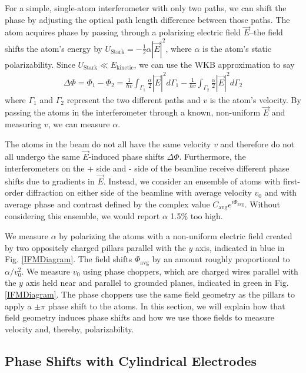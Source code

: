 \documentclass[twocolumn,prl,showpacs,superscriptaddress]{revtex4-1}   %
\newcommand{\abs}[1]{\left|#1\right|}
\newcommand{\figref}[1]{Fig. \ref{#1}}
\begin{document}
For a simple, single-atom interferometer with only two paths, we can shift the phase by adjusting the optical path length difference between those paths. The atom acquires phase by passing through a polarizing electric field $\vec{E}$--the field shifts the atom's energy by $U_{\mathrm{Stark}} = -\frac{1}{2}\alpha\abs{\vec{E}}^2$, where $\alpha$ is the atom's static polarizability. Since $U_{\mathrm{Stark}} \ll E_{\mathrm{kinetic}}$, we can use the WKB approximation to say
\begin{align}
	\Delta\Phi = \Phi_1 - \Phi_2 =
	\frac{1}{\hbar v} \int_{\Gamma_1} \frac{\alpha}{2}|\vec{E}|^2 d\Gamma_1 -
	\frac{1}{\hbar v} \int_{\Gamma_2} \frac{\alpha}{2}|\vec{E}|^2 d\Gamma_2
	\label{deltaPhaseGeneral}
\end{align}
where $\Gamma_1$ and $\Gamma_2$ represent the two different paths and $v$ is the atom's velocity. By passing the atoms in the interferometer through a known, non-uniform $\vec{E}$ and measuring $v$, we can measure $\alpha$.

The atoms in the beam do not all have the same velocity $v$ and therefore do not all undergo the same $\vec{E}$-induced phase shifts $\Delta\Phi$. Furthermore, the interferometers on the + side and - side of the beamline receive different phase shifts due to gradients in $\vec{E}$. Instead, we consider an ensemble of atoms with first-order diffraction on either side of the beamline with average velocity $v_0$ and with average phase and contrast defined by the complex value $C_{\mathrm{avg}}e^{i\Phi_{\mathrm{avg}}}$. Without considering this ensemble, we would report $\alpha$ 1.5\% too high.

We measure $\alpha$ by polarizing the atoms with a non-uniform electric field created by two oppositely charged pillars parallel with the $y$ axis, indicated in blue in \figref{IFMDiagram}. The field shifts $\Phi_{\mathrm{avg}}$ by an amount roughly proportional to $\alpha/v_0^2$. We measure $v_0$ using phase choppers, which are charged wires parallel with the $y$ axis held near and parallel to grounded planes, indicated in green in \figref{IFMDiagram}. The phase choppers use the same field geometry as the pillars to apply a $\pm\pi$ phase shift to the atoms. In this section, we will explain how that field geometry induces phase shifts and how we use those fields to measure velocity and, thereby, polarizability. 

\subsection{Phase Shifts with Cylindrical Electrodes}
 
\end{document}
